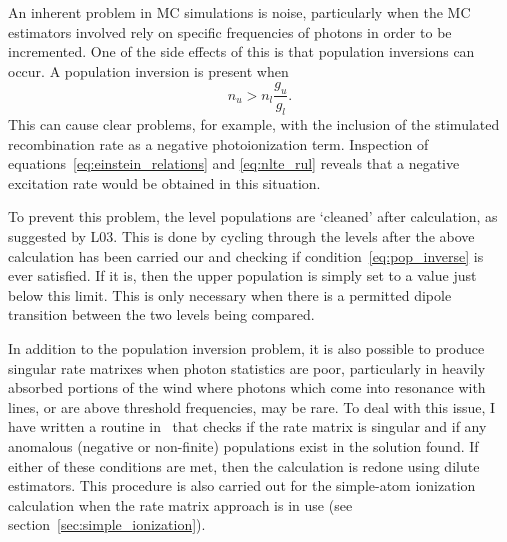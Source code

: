 An inherent problem in MC simulations is noise, particularly
when the MC estimators involved rely on specific frequencies of
photons in order to be incremented. One of the side effects
of this is that population inversions can occur. A population
inversion is present when 
\begin{equation}
n_u > n_l \frac{g_u}{g_l}.
\label{eq:pop_inverse}
\end{equation}
This can cause clear problems, for example, with the inclusion
of the stimulated recombination rate as a negative photoionization
term. Inspection of equations~\ref{eq:einstein_relations} 
and \ref{eq:nlte_rul} reveals that a negative
excitation rate would be obtained in this situation.

To prevent this problem, the level populations are `cleaned' 
after calculation, as suggested by L03. 
This is done by cycling through the levels
after the above calculation has been carried our and checking if
condition~\ref{eq:pop_inverse} is ever satisfied. If it is, then
the upper population is simply set to a value just below this limit.
This is only necessary when there is a permitted dipole transition 
between the two levels being compared.

In addition to the population inversion problem, it is also possible to 
produce singular rate matrixes when photon statistics are poor, 
particularly in heavily absorbed portions of the wind where photons
which come into resonance with lines, or are above threshold frequencies,
may be rare. To deal with this issue, I have written a routine in \py\
that checks if the rate matrix is singular and if any anomalous (negative or
non-finite) populations exist in the solution found. If either of these 
conditions are met, then the calculation is redone using dilute estimators.
This procedure is also carried out for the simple-atom ionization
calculation when the rate matrix approach is in use 
(see section~\ref{sec:simple_ionization}).